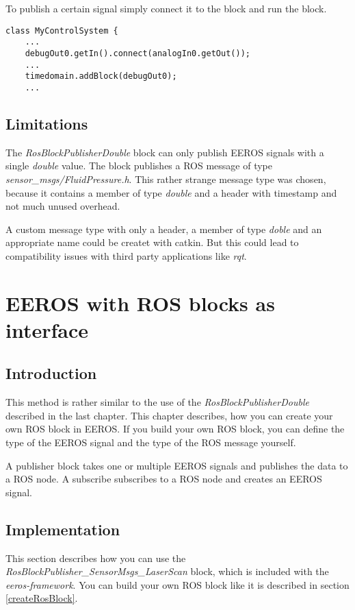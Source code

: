 To publish a certain signal simply connect it to the block and run the block.
\lstset{language=c}
\begin{lstlisting}
class MyControlSystem {
	...
	debugOut0.getIn().connect(analogIn0.getOut());
	...
	timedomain.addBlock(debugOut0);
	...
\end{lstlisting}

\subsection{Limitations}
The \textit{RosBlockPublisherDouble} block can only publish EEROS signals with a single \textit{double} value.
The block publishes a ROS message of type \textit{sensor\_msgs/FluidPressure.h}.
This rather strange message type was chosen, because it contains a member of type \textit{double} and a header with timestamp and not much unused overhead.

A custom message type with only a header, a member of type \textit{doble} and an appropriate name could be createt with catkin.
But this could lead to compatibility issues with third party applications like \textit{rqt}.


\section{EEROS with ROS blocks as interface}
\label{rosBlocks}
\subsection{Introduction}
This method is rather similar to the use of the \textit{RosBlockPublisherDouble} described in the last chapter.
This chapter describes, how you can create your own ROS block in EEROS.
If you build your own ROS block, you can define the type of the EEROS signal and the type of the ROS message yourself.

A publisher block takes one or multiple EEROS signals and publishes the data to a ROS node.
A subscribe subscribes to a ROS node and creates an EEROS signal.

\subsection{Implementation}
This section describes how you can use the \textit{RosBlockPublisher\_SensorMsgs\_LaserScan} block, which is included with the \textit{eeros-framework}.
You can build your own ROS block like it is described in section \ref{createRosBlock}.

